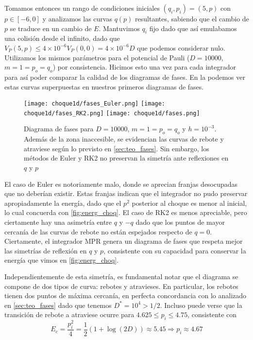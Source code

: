 Tomamos entonces un rango de condiciones iniciales $(q_i,p_i)=(5,p)$ con $p\in [-6,0]$ y analizamos las curvas $q(p)$ resultantes, sabiendo que el cambio de $p$ se traduce en un cambio de $E$.
Mantuvimos $q_i$ fijo dado que así emulabamos una colisión desde el infinito, dado que $V_P(5,p)\leq 4\times10^{-6}V_P(0,0) = 4\times10^{-6}D$ que podemos considerar nulo.
Utilizamos los mismos parámetros para el potencial de Pauli ($D=10000$, $m=1=p_o=q_o$) por consistencia.
Hicimos esto una vez para cada integrador para así poder comparar la calidad de los diagramas de fases.
En la  podemos ver estas curvas superpuestas en nuestros primeros diagramas de fases.

\begin{figure}[H]
	\centering	%
	\texttt{[image: choque1d/fases\_Euler.png]}
	\texttt{[image: choque1d/fases\_RK2.png]}
	\texttt{[image: choque1d/fases.png]}
	\caption{Diagrama de fases para $D=10000$, $m=1=p_o=q_o$ y $h=10^{-3}$. Además de la zona inaccesible, se evidencian las curvas de rebote y atraviese según lo previsto en \ref{sec:teo_fases}.
	Sin embargo, los métodos de Euler y RK2 no preservan la simetría ante reflexiones en $q$ y $p$}
	\label{fig:ej_diag_fases}
\end{figure}

El caso de Euler es notoriamente malo, donde se aprecian franjas desocupadas que no deberían existir.
Estas franjas indican que el integrador no pudo preservar apropiadamente la energía, dado que el $p^2$ posterior al choque es menor al inicial, lo cual concuerda con \ref{fig:energ_choq}.
El caso de RK2 es menos apreciable, pero ciertamente hay una asimetría entre $q$ y $-q$ dado que los puntos de mayor cercanía de las curvas de rebote no están espejados respecto de $q=0$.
Ciertamente, el integrador MPR genera un diagrama de fases que respeta mejor las simetrías de reflexión en $q$ y $p$, consistente con su capacidad para conservar la energía que vimos en \ref{fig:energ_choq}.

Independientemente de esta simetría, es fundamental notar que el diagrama se compone de dos tipos de curva: rebotes y atravieses.
En particular, los rebotes tienen dos puntos de máxima cercanía, en perfecta concordancia con lo analizado en \ref{sec:teo_fases} dado que tenemos $D^*=10^4>1/2$.
Incluso puede verse que la transición de rebote a atraviese ocurre para $4.625\leq p_i\leq4.75$, consistente con
\[ E_c = \frac{p_i^2}{4} = \frac{1}{2}\left( 1 + \log(2D) \right) \approx 5.45 \Longrightarrow p_i \approx 4.67 \]

